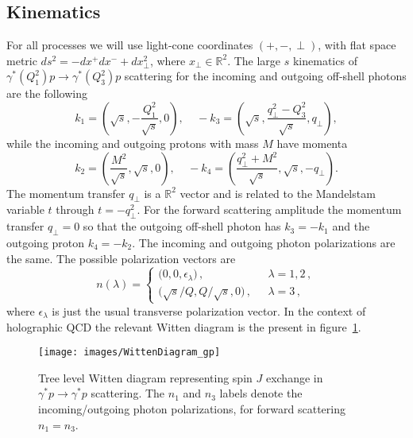 \documentclass[a4paper,12pt]{article}
\begin{document}
\subsection{Kinematics}
For all processes we will use light-cone coordinates $\left(+,-,\perp \right)$, with flat space metric $ds^2 = - dx^+ dx^- + d x^2_\perp$, where $x_\perp \in \mathbb{R}^2$.
The large $s$ kinematics of  $\gamma^{*} \left(Q_1^2\right) p \rightarrow \gamma^{*} \left(Q_3^2\right) p $ scattering for the incoming and outgoing off-shell photons are the following
\begin{equation}
k_1=\left(\!\sqrt{s},-\frac{Q_1^2}{\sqrt{s}} ,0\right),
\ \ \ \ \ 
-k_3=\left(\sqrt{s} , \frac{q_\perp^2 - Q_3^2}{\sqrt{s}}, q_\perp \right),
\label{eq:gp_off_shell_photons_kinematics}
\end{equation}
while the incoming and outgoing protons with mass $M$ have momenta
\begin{equation}
k_2=\left(\frac{M^2}{\sqrt{s}} , \sqrt{s}, 0\right),
\ \ \ \ \ 
-k_4=\left(\frac{q_\perp^2 + M^2}{\sqrt{s}}, \sqrt{s},  -q_\perp \right).
\label{eq:gp_off_shell_photons_kinematics}
\end{equation}
The momentum transfer $q_\perp$ is a $\mathbb{R}^2$ vector and is related to the Mandelstam variable $t$ through $t = - q_\perp^2$.
For the forward scattering amplitude the 
momentum transfer $q_\perp = 0$ so that the outgoing off-shell photon has $k_3=-k_1$ and the outgoing
proton $k_4=-k_2$. The  incoming and outgoing photon polarizations are the same.
The possible polarization vectors are
\begin{equation}
  \label{eq:polarization vectors} 
n(\lambda) = \begin{cases}
    \big(0,0,\epsilon_\lambda\big) \,, & \ \ \ \lambda=1,2 \,,\\
   \big( \sqrt{s}/Q, Q/\sqrt{s},0  \big)\, , & \ \ \ \lambda=3\,,
    \end{cases}
\end{equation}
where $\epsilon_\lambda$ is just the usual transverse polarization vector.
In the context of holographic QCD the relevant Witten diagram is the present in figure~\ref{fig:Witten_diagram_gp}.
\begin{figure}[!t]
  \center
  \texttt{[image: images/WittenDiagram\_gp]} 
  \caption{Tree level Witten diagram representing spin $J$    exchange in  $\gamma^* p\to\gamma^* p$ scattering. 
The $n_1$ and $n_3$ labels denote the incoming/outgoing photon polarizations, for forward scattering $n_1=n_3$.
}
  \label{fig:Witten_diagram_gp}
\end{figure}
\end{document}
